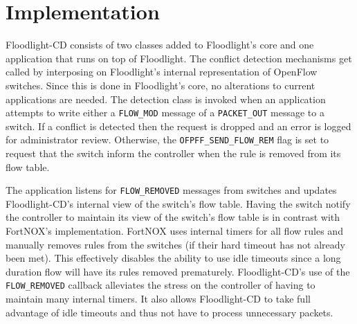 \section{Implementation}
\label{sec:implementation}

Floodlight-CD consists of two classes added to Floodlight's core and one application that runs on top of Floodlight.
The conflict detection mechanisms get called by interposing on Floodlight's internal representation of OpenFlow switches.
Since this is done in Floodlight's core, no alterations to current applications are needed.
The detection class is invoked when an application attempts to write either a \texttt{FLOW\_MOD} message of a \texttt{PACKET\_OUT} message to a switch.
If a conflict is detected then the request is dropped and an error is logged for administrator review.
Otherwise, the \texttt{OFPFF\_SEND\_FLOW\_REM} flag is set to request that the switch inform the controller when the rule is removed from its flow table.

The application listens for \texttt{FLOW\_REMOVED} messages from switches and updates Floodlight-CD's internal view of the switch's flow table.
Having the switch notify the controller to maintain its view of the switch's flow table is in contrast with FortNOX's implementation.
FortNOX uses internal timers for all flow rules and manually removes rules from the switches (if their hard timeout has not already been met).
This effectively disables the ability to use idle timeouts since a long duration flow will have its rules removed prematurely.
Floodlight-CD's use of the \texttt{FLOW\_REMOVED} callback alleviates the stress on the controller of having to maintain many internal timers.
It also allows Floodlight-CD to take full advantage of idle timeouts and thus not have to process unnecessary packets.

